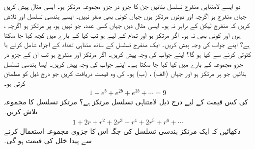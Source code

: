 دو ایسے لامتناہی منفرج تسلسل بنائیں جن کا جزو در جزو مجموعہ مرتکز ہو۔
ایسی مثال پیش کریں جہاں  منفرج ہو اگرچہ  اور  دونوں مرتکز ہوں   جہاں کوئی  بھی   صفر نہیں۔
ایسے ہندسی تسلسل  اور  تلاش کریں کہ  منفرج  لیکن  کے برابر نہ ہو۔
ایسی مثال دیں جہاں  کسی عدد، جو   نہیں ہو،  پر مرتکز ہو  اگرچہ ،  ہوں اور کوئی  بھی  نہ ہو۔ 
اگر  مرتکز ہو اور تمام  کے لیے  ہو تب کیا  کے بارے میں کچھ کہا جا سکتا ہے؟ اپنے جواب کی وجہ پیش کریں۔ 
ایک منفرج تسلسل کے ساتھ متناہی تعداد کے اجزاء شامل کرنے یا کٹوتی کرنے  سے کیا ہو گا؟ اپنے جواب کی وجہ پیش کریں۔ 
اگر  مرتکز اور  منفرج ہو تب ان کے جزو در جزو مجموعہ  کے بارے میں کیا کہا جا سکتا ہے۔ اپنے جواب کی وجہ پیش کریں۔
ایسا ہندسی تسلسل  بنائیں جو  پر مرتکز ہو اور جہاں (الف) ، (ب)  ہو۔
 کی وہ قیمت دریافت کریں جو درج ذیل کو مطمئن کرتی ہو۔
\begin{align*}
1+e^b+e^{2b}+e^{3b}+\cdots=9
\end{align*}
 کی کس قیمت کے لیے درج ذیل لامتناہی تسلسل مرتکز ہے؟ مرتکز تسلسل کا مجموعہ تلاش کریں۔ 
\begin{align*}
1+2r+r^2+2r^3+r^4+2r^5+r^6+\cdots
\end{align*}
دکھائیں کہ ایک مرتکز ہندسی تسلسل کی جگہ اس کا جزوی مجموعہ  استعمال کرنے سے پیدا خلل  کی قیمت  ہو گی۔ 
